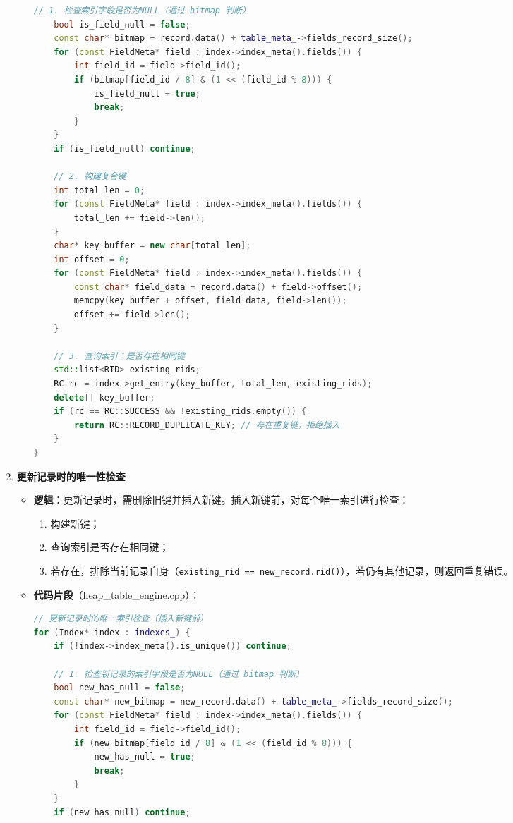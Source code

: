 \documentclass[a4paper, 12pt]{article}
\begin{document}
\begin{enumerate}
\begin{itemize}
\begin{lstlisting}[language=C++]
    // 1. 检查索引字段是否为NULL（通过 bitmap 判断）
    bool is_field_null = false;
    const char* bitmap = record.data() + table_meta_->fields_record_size();
    for (const FieldMeta* field : index->index_meta().fields()) {
        int field_id = field->field_id();
        if (bitmap[field_id / 8] & (1 << (field_id % 8))) {
            is_field_null = true;
            break;
        }
    }
    if (is_field_null) continue;

    // 2. 构建复合键
    int total_len = 0;
    for (const FieldMeta* field : index->index_meta().fields()) {
        total_len += field->len();
    }
    char* key_buffer = new char[total_len];
    int offset = 0;
    for (const FieldMeta* field : index->index_meta().fields()) {
        const char* field_data = record.data() + field->offset();
        memcpy(key_buffer + offset, field_data, field->len());
        offset += field->len();
    }

    // 3. 查询索引：是否存在相同键
    std::list<RID> existing_rids;
    RC rc = index->get_entry(key_buffer, total_len, existing_rids);
    delete[] key_buffer;
    if (rc == RC::SUCCESS && !existing_rids.empty()) {
        return RC::RECORD_DUPLICATE_KEY; // 存在重复键，拒绝插入
    }
}
        \end{lstlisting}
    \end{itemize}

    \item \textbf{更新记录时的唯一性检查}
    
\begin{itemize}
        \item \textbf{逻辑}：更新记录时，需删除旧键并插入新键。插入新键前，对每个唯一索引进行检查：
        \begin{enumerate}
            \item 构建新键；
            \item 查询索引是否存在相同键；
            \item 若存在，排除当前记录自身（\texttt{existing\_rid == new\_record.rid()}），若仍有其他记录，则返回重复错误。
        \end{enumerate}
        \item \textbf{代码片段}（heap\_table\_engine.cpp）：
        
\begin{lstlisting}[language=C++]
// 更新记录时的唯一索引检查（插入新键前）
for (Index* index : indexes_) {
    if (!index->index_meta().is_unique()) continue;

    // 1. 检查新记录的索引字段是否为NULL（通过 bitmap 判断）
    bool new_has_null = false;
    const char* new_bitmap = new_record.data() + table_meta_->fields_record_size();
    for (const FieldMeta* field : index->index_meta().fields()) {
        int field_id = field->field_id();
        if (new_bitmap[field_id / 8] & (1 << (field_id % 8))) {
            new_has_null = true;
            break;
        }
    }
    if (new_has_null) continue;


\end{lstlisting}
\end{itemize}
\end{enumerate}
\end{document}
